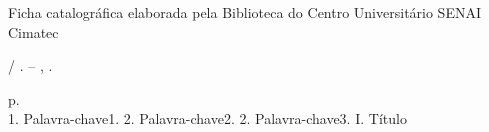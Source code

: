 \begin{fichacatalografica}
	\sffamily
	\vspace*{\fill}					%
Ficha catalográfica elaborada pela Biblioteca do Centro Universitário SENAI Cimatec
	\begin{center}					%
	\hline
	\begin{minipage}[c][8cm]{13.5cm}		%
	\small
	\imprimirautor
	
	\hspace{0.5cm} \imprimirtitulo  / \imprimirautor. --
	\imprimirlocal, \imprimirdata.
	
	\hspace{0.5cm} \thelastpage p. \\%
	
	
	
	\hspace{0.5cm}
		1. Palavra-chave1.
		2. Palavra-chave2.
		2. Palavra-chave3.
		I. Título
	\end{minipage}
	\hline
	\end{center}
\end{fichacatalografica}